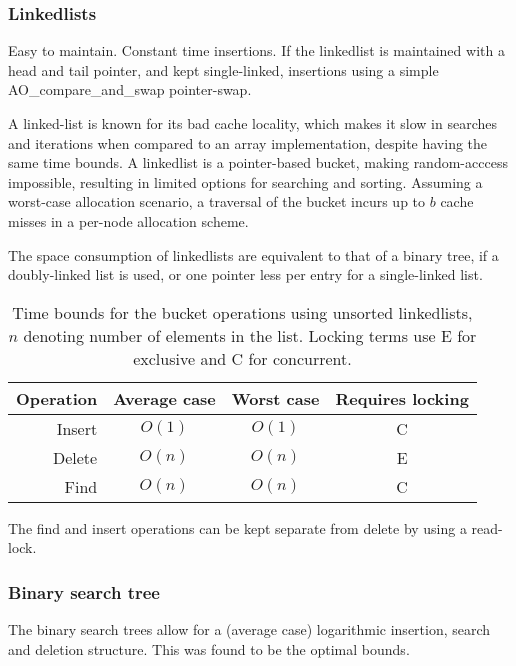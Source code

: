 \subsubsection{Linkedlists}
Easy to maintain. Constant time insertions.
If the linkedlist is maintained with a {\keyword head} and {\keyword tail} pointer,
and kept single-linked, insertions using a simple {\keyword AO\_compare\_and\_swap}
pointer-swap.

A linked-list is known for its bad cache locality, which makes it slow in
searches and iterations when compared to an array implementation, despite
having the same time bounds. A linkedlist is a pointer-based bucket, making
random-acccess impossible, resulting in limited options for searching and
sorting. Assuming a worst-case allocation scenario, a traversal of the bucket
incurs up to $b$ cache misses in a per-node allocation scheme.

The space consumption of linkedlists are equivalent to that of a binary tree,
if a doubly-linked list is used, or one pointer less per entry for a
single-linked list.

\begin{table}[h!]
    \centering
    \begin{tabular}[here]{ r || c | c | c}
        Operation & Average case & Worst case & Requires locking  \\ \hline
        Insert    & $O(1)$ & $O(1)$   & C  \\ \hline
        Delete    & $O(n)$ & $O(n)$   & E \\ \hline
        Find      & $O(n)$ & $O(n)$   & C  \\ \hline
    \end{tabular}
    \caption{Time bounds for the bucket operations using unsorted linkedlists,
    $n$ denoting number of elements in the list. Locking terms use E for
        exclusive and C for concurrent.}
    \label{tab:bounds:linkedlist}
\end{table}
The find and insert operations can be kept separate from delete by using a
read-lock.

\subsubsection{Binary search tree}
The binary search trees allow for a (average case) logarithmic insertion,
search and deletion structure. This was found to be the optimal
bounds\cite{Nash:2008}.

